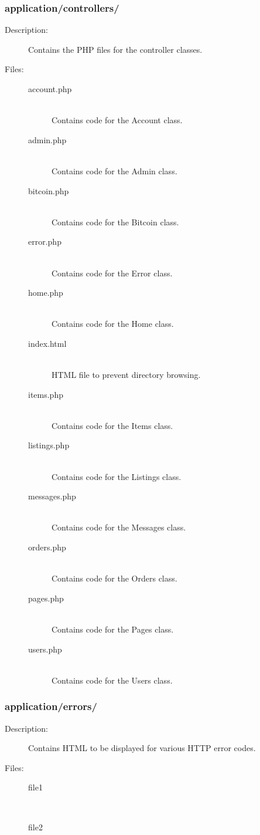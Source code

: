 \documentclass[11pt]{article} %
\begin{document}
\subsubsection{application/controllers/}
\begin{description}
\item[Description:] Contains the PHP files for the controller classes.
\item[Files:] \textbf{ }
\begin{description}
\item[account.php]  \textbf{ }\\
Contains code for the Account class.
\item[admin.php]  \textbf{ }\\
Contains code for the Admin class.
\item[bitcoin.php]  \textbf{ }\\
Contains code for the Bitcoin class.
\item[error.php]  \textbf{ }\\
Contains code for the Error class.
\item[home.php]  \textbf{ }\\
Contains code for the Home class.
\item[index.html]  \textbf{ }\\
HTML file to prevent directory browsing.
\item[items.php]  \textbf{ }\\
Contains code for the Items class.
\item[listings.php]  \textbf{ }\\
Contains code for the Listings class.
\item[messages.php]  \textbf{ }\\
Contains code for the Messages class.
\item[orders.php]  \textbf{ }\\
Contains code for the Orders class.
\item[pages.php]  \textbf{ }\\
Contains code for the Pages class.
\item[users.php]  \textbf{ }\\
Contains code for the Users class.
\end{description} 
\end{description} 

\subsubsection{application/errors/}
\begin{description}
\item[Description:] Contains HTML to be displayed for various HTTP error codes.
\item[Files:] \textbf{ }
\begin{description}
\item[file1]  \textbf{ }\\
\item[file2]  \textbf{ }\\
\end{description} 
\end{description} 
\end{document}
